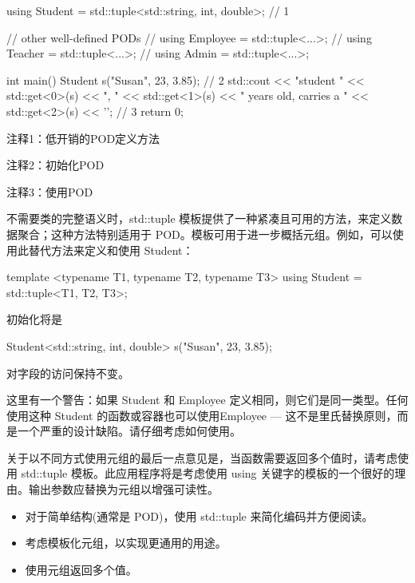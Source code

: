
\begin{cpp}
using Student = std::tuple<std::string, int, double>; // 1

// other well-defined PODs
// using Employee = std::tuple<...>;
// using Teacher = std::tuple<...>;
// using Admin = std::tuple<...>;

int main() {
  Student s("Susan", 23, 3.85); // 2
  std::cout << "student " << std::get<0>(s) << ", " << std::get<1>(s)
      << " years old, carries a " << std::get<2>(s) << '\n'; // 3
  return 0;
}
\end{cpp}

{\footnotesize
注释1：低开销的POD定义方法

注释2：初始化POD

注释3：使用POD
}

不需要类的完整语义时，std::tuple 模板提供了一种紧凑且可用的方法，来定义数据聚合；这种方法特别适用于 POD。模板可用于进一步概括元组。例如，可以使用此替代方法来定义和使用 Student：

\begin{cpp}
template <typename T1, typename T2, typename T3>
using Student = std::tuple<T1, T2, T3>;
\end{cpp}

初始化将是

\begin{cpp}
Student<std::string, int, double> s("Susan", 23, 3.85);
\end{cpp}

对字段的访问保持不变。

这里有一个警告：如果 Student 和 Employee 定义相同，则它们是同一类型。任何使用这种 Student 的函数或容器也可以使用Employee — 这不是里氏替换原则，而是一个严重的设计缺陷。请仔细考虑如何使用。

关于以不同方式使用元组的最后一点意见是，当函数需要返回多个值时，请考虑使用 std::tuple 模板。此应用程序将是考虑使用 using 关键字的模板的一个很好的理由。输出参数应替换为元组以增强可读性。


\begin{itemize}
\item
对于简单结构(通常是 POD)，使用 std::tuple 来简化编码并方便阅读。

\item
考虑模板化元组，以实现更通用的用途。

\item
使用元组返回多个值。
\end{itemize}









